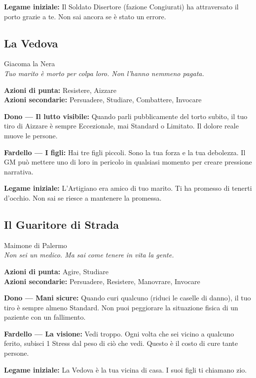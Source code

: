 \textbf{Legame iniziale:} Il Soldato Disertore (fazione Congiurati)
ha attraversato il porto grazie a te. Non sai ancora se è stato
un errore.

\filetto

\subsection{La Vedova}
{\cinzel\footnotesize\color{grigionote} Giacoma la Nera}\\
\textit{Tuo marito è morto per colpa loro. Non l'hanno nemmeno pagata.}

\textbf{Azioni di punta:} Resistere, Aizzare\\
\textbf{Azioni secondarie:} Persuadere, Studiare, Combattere, Invocare

\textbf{Dono — Il lutto visibile:} Quando parli pubblicamente del
torto subito, il tuo tiro di Aizzare è sempre Eccezionale, mai
Standard o Limitato. Il dolore reale muove le persone.

\textbf{Fardello — I figli:} Hai tre figli piccoli. Sono la tua
forza e la tua debolezza. Il GM può mettere uno di loro in pericolo
in qualsiasi momento per creare pressione narrativa.

\textbf{Legame iniziale:} L'Artigiano era amico di tuo marito.
Ti ha promesso di tenerti d'occhio. Non sai se riesce a mantenere
la promessa.

\filetto

\subsection{Il Guaritore di Strada}
{\cinzel\footnotesize\color{grigionote} Maimone di Palermo}\\
\textit{Non sei un medico. Ma sai come tenere in vita la gente.}

\textbf{Azioni di punta:} Agire, Studiare\\
\textbf{Azioni secondarie:} Persuadere, Resistere, Manovrare, Invocare

\textbf{Dono — Mani sicure:} Quando curi qualcuno (riduci le
caselle di danno), il tuo tiro è sempre almeno Standard. Non
puoi peggiorare la situazione fisica di un paziente con un fallimento.

\textbf{Fardello — La visione:} Vedi troppo. Ogni volta che
sei vicino a qualcuno ferito, subisci 1 Stress dal peso di
ciò che vedi. Questo è il costo di cure tante persone.

\textbf{Legame iniziale:} La Vedova è la tua vicina di casa.
I suoi figli ti chiamano zio.

